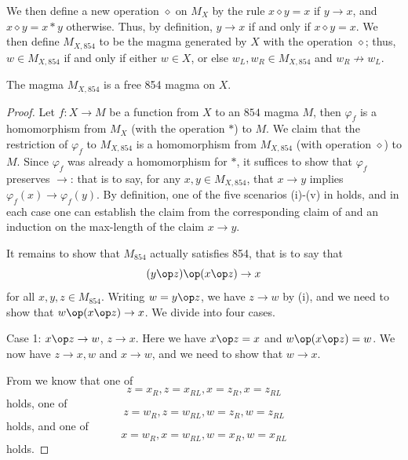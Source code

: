 We then define a new operation $\diamond$ on $M_X$ by the rule $x \diamond y = x$ if $y \to x$, and $x \diamond y = x*y$ otherwise. Thus, by definition, $y \to x$ if and only if $x \diamond y = x$.  We then define $M_{X,854}$ to be the magma generated by $X$ with the operation $\diamond$; thus, $w \in M_{X,854}$ if and only if either $w \in X$, or else $w_L, w_R \in M_{X,854}$ and $w_R \not \to w_L$.

\begin{theorem}\label{free-854}  The magma $M_{X,854}$ is a free 854 magma on $X$.
\end{theorem}

\begin{proof}  Let  $f: X \to M$ be a function from $X$ to an $854$ magma $M$, then $\varphi_f$ is a homomorphism from $M_X$ (with the operation $*$) to $M$.  We claim that the restriction of $\varphi_f$ to $M_{X,854}$ is a homomorphism from $M_{X,854}$ (with operation $\diamond$) to $M$.  Since $\varphi_f$ was already a homomorphism for $*$, it suffices to show that $\varphi_f$ preserves $\to$: that is to say, for any $x,y \in M_{X,854}$, that $x \to y$ implies $\varphi_f(x) \to \varphi_f(y)$.  By definition, one of the five scenarios (i)-(v) in  holds, and in each case one can establish the claim from the corresponding claim of  and an induction on the max-length of the claim $x \to y$.

It remains to show that $M_{854}$ actually satisfies 854, that is to say that
$$ (y \op z) \op (x \op z) \to x$$
for all $x,y,z \in M_{854}$.  Writing $w = y \op z$, we have $z \to w$ by (i), and we need to show that $w \op (x \op z) \to x$.  We divide into four cases.

Case 1: $x \op z \to w$, $z \to x$.  Here we have $x \op z = x$ and $w \op (x \op z) = w$.  We now have $z \to x,w$ and $x \to w$, and we need to show that $w \to x$.

From  we know that one of
\begin{equation}\label{one-1}
  z = x_R, z = x_{RL}, x = z_R, x = z_{RL}
\end{equation}
holds, one of
\begin{equation}\label{one-2}
  z = w_R, z = w_{RL}, w = z_R, w = z_{RL}
\end{equation}
holds, and one of
\begin{equation}\label{one-3}
  x = w_R, x = w_{RL}, w = x_R, w = x_{RL}
\end{equation}
holds.


\end{proof}
